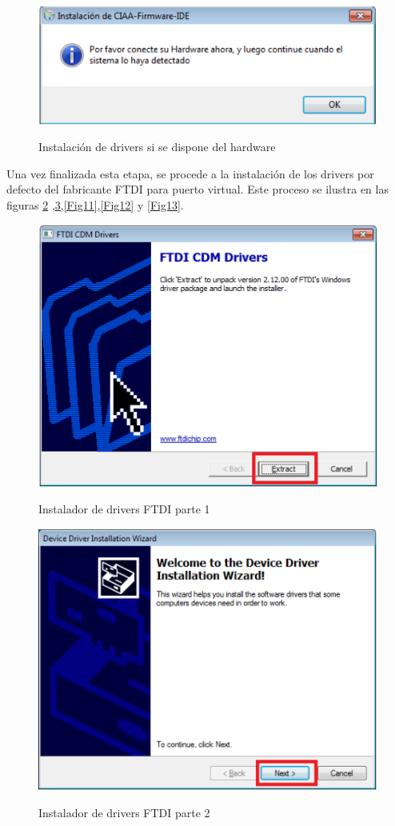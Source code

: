 \documentclass[12pt,letterpaper]{article}
\begin{document}
\begin{center}
\begin{figure}[!h]
\centering
\includegraphics[width=6 cm]{figuras/instalacion6.png}\\
\caption{Instalación de drivers si se dispone del hardware}
\label{Fig9}
\end{figure}
\end{center}

Una vez finalizada esta etapa, se procede a la instalación de los drivers por defecto del fabricante FTDI para puerto virtual. Este proceso se ilustra en las figuras \ref{driversFTDI} ,\ref{Fig10},\ref{Fig11},\ref{Fig12} y \ref{Fig13}.
\begin{center}
\begin{figure}[!h]
\centering
\includegraphics[width=6 cm]{figuras/instalacion7.png}\\
\caption{Instalador de drivers FTDI parte 1}
\label{driversFTDI}
\end{figure}
\end{center}
\begin{center}
\begin{figure}[!h]
\centering
\includegraphics[width=6 cm]{figuras/instalacion8.png}\\
\caption{Instalador de drivers FTDI parte 2}
\label{Fig10}
\end{figure}
\end{center}
\end{document}
